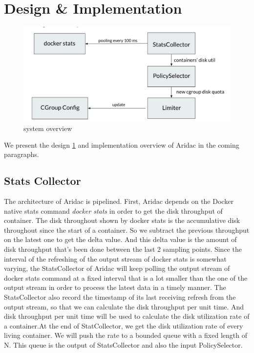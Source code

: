 \documentclass[10pt, conference,compsoc]{IEEEtran}
\begin{document}
\section{Design \& Implementation}
\begin{figure}
  \centering
    \includegraphics[width=\linewidth]{resources/design.pdf}
    \caption{system overview}
    \label{fig:design}
  \end{figure}
We present the design \ref{fig:design} and implementation overview of Aridac in the coming paragraphs. \\

\subsection{Stats Collector}
The architecture of Aridac is pipelined. First, Aridac depends on the Docker native stats command \textit{docker stats} in order to get the disk throughput of container. The disk throughout shown by docker stats is the accumulative disk throughout since the start of a container. So we subtract the previous throughput on the latest one to get the delta value. And this delta value is the amount of disk throughput that's been done between the last 2 sampling points. Since the interval of the refreshing of the output stream of docker stats is somewhat varying, the StatsCollector of Aridac will keep polling the output stream of docker stats command at a fixed interval that is a lot smaller than the one of the output stream in order to process the latest data in a timely manner. The StatsCollector also record the timestamp of its last receiving refresh from the output stream, so that we can calculate the disk throughput per unit time. And disk throughput per unit time will be used to calculate the disk utilization rate of a container.At the end of StatCollector, we get the disk utilization rate of every living container. We will push the rate to a bounded queue with a fixed length of N. This queue is the output of StatsCollector and also the input PolicySelector.\\
\end{document}
